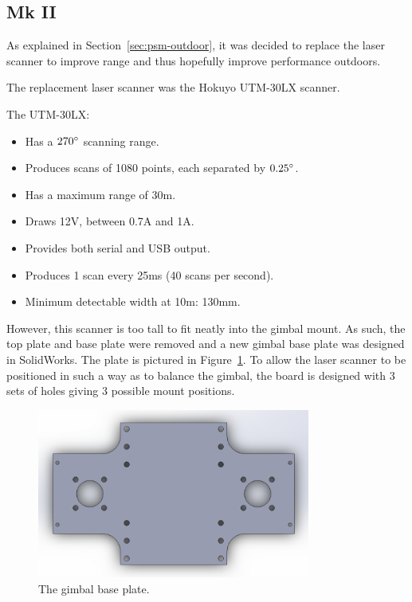 \documentclass[12pt,oneside,a4paper]{book}
\begin{document}
\subsection{Mk II}
\label{sec:mk-ii}

As explained in Section~\ref{sec:psm-outdoor}, it was decided to
replace the laser scanner to improve range and thus hopefully improve
performance outdoors.

The replacement laser scanner was the Hokuyo UTM-30LX scanner. 

The UTM-30LX:
\begin{itemize}
\item Has a $270\degree$ scanning range.
\item Produces scans of 1080 points, each separated by $0.25\degree$.
\item Has a maximum range of 30m.
\item Draws 12V, between 0.7A and 1A.
\item Provides both serial and USB output.
\item Produces 1 scan every 25ms (40 scans per second).
\item Minimum detectable width at 10m: 130mm.
\end{itemize}

However, this scanner is too tall to fit neatly into the gimbal
mount. As such, the top plate and base plate were removed and a new
gimbal base plate was designed in SolidWorks. The plate is pictured in
Figure~\ref{fig:baseplate}. To allow the laser scanner to be
positioned in such a way as to balance the gimbal, the board is
designed with 3 sets of holes giving 3 possible mount positions.

\begin{figure}[h]
  \centering
  \includegraphics[width=0.8\textwidth]{figs/baseplate}
  \caption{The gimbal base plate.}
  \label{fig:baseplate}
\end{figure}
\end{document}
